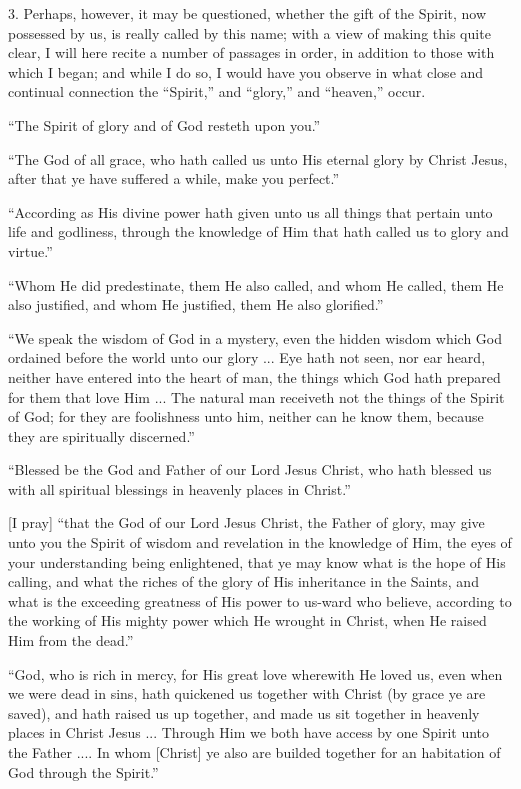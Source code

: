 3. Perhaps, however, it may be questioned, whether the gift of the
Spirit, now possessed by us, is really called by this name; with a
view of making this quite clear, I will here recite a number of
passages in order, in addition to those with which I began; and while
I do so, I would have you observe in what close and continual
connection the ``Spirit,'' and ``glory,'' and
``heaven,'' occur.

``The Spirit of glory and of God resteth upon you.''

``The God of all grace, who hath called us unto His eternal
glory by Christ Jesus, after that ye have suffered a while, make you
perfect.''

``According as His divine power hath given unto us all things
that pertain unto life and godliness, through the knowledge of Him
that hath called us to glory and virtue.''

``Whom He did predestinate, them He also called, and whom He
called, them He also justified, and whom He justified, them He also
glorified.''

``We speak the wisdom of God in a mystery, even the hidden
wisdom which God ordained before the world unto our glory ... Eye hath
not seen, nor ear heard, neither have entered into the heart of man,
the things which God hath prepared for them that love Him ... The
natural man receiveth not the things of the Spirit of God; for they
are foolishness unto him, neither can he know them, because they are
spiritually discerned.''

``Blessed be the God and Father of our Lord Jesus Christ, who
hath blessed us with all spiritual blessings in heavenly places in
Christ.''

[I pray] ``that the God of our Lord Jesus Christ, the Father of
glory, may give unto you the Spirit of wisdom and revelation in the
knowledge of Him, the eyes of your understanding being enlightened,
that ye may know what is the hope of His calling, and what the riches
of the glory of His inheritance in the Saints, and what is the
exceeding greatness of His power to us-ward who believe, according to
the working of His mighty power which He wrought in Christ, when He
raised Him from the dead.''

``God, who is rich in mercy, for His great love wherewith He
loved us, even when we were dead in sins, hath quickened us together
with Christ (by grace ye are saved), and hath raised us up together,
and made us sit together in heavenly places in Christ Jesus ...
Through Him we both have access by one Spirit unto the Father .... In
whom [Christ] ye also are builded together for an habitation of God
through the Spirit.''

